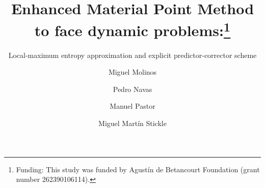 \usetikzlibrary{%
    decorations.pathreplacing,%
    decorations.pathmorphing%
}


%

\newcommand{\Matrix}[1]{
  \ensuremath{\mathbf{{#1}}}
}
\newcommand{\Vector}[1]{
  \ensuremath{\mathbf{{#1}}}
}

\newcommand{\Div}[1]{
  \ensuremath{div({#1})}
}
\newcommand\Grad[1]{grad({#1})}
\newcommand\GradS[1]{grad^s({#1})}
\newcommand\GradT[1]{grad^T({#1})}


\newcommand{\Deriv}[3][]{
  \ensuremath{\frac{\partial^{#1}{#2}}{ \partial {#3}^{#1} }}
}

\newcommand{\Integral}[2]{
  \IfStrEqCase{#1}{
    {2}{\ensuremath{\int_{\varGamma_d}{#2}\ d\varGamma}}
    {3}{\ensuremath{\int_{\varOmega}{#2}\ d\varOmega}}
  }
}

%
%



\title{Enhanced Material Point Method to face
  dynamic problems:\thanks{Funding: This
    study was funded by Agustín de Betancourt Foundation (grant number
    262390106114).}
}
\subtitle{Local-maximum entropy approximation and explicit
  predictor-corrector scheme}


\author{Miguel Molinos \and
  Pedro Navas \and
  Manuel Pastor \and
  Miguel Martín Stickle
}




